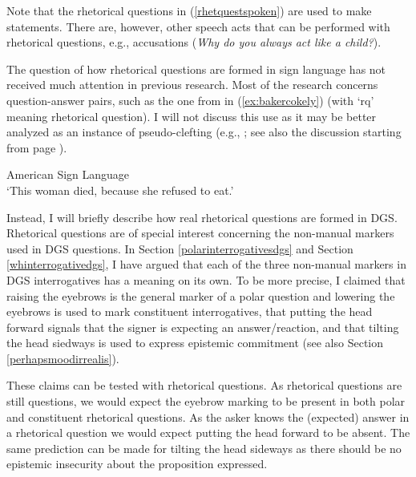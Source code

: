 \noindent Note that the rhetorical questions in (\ref{rhetquestspoken}) are used to make statements. There are, however, other speech acts that can be performed with rhetorical questions, e.g.,  accusations (\textit{Why do you always act like a child?}).

The question of how rhetorical questions are formed in sign language has not received much attention in previous research. Most of the research concerns question-answer pairs, such as the one from \citet[138]{baker1980american} in (\ref{ex:bakercokely}) (with `rq' meaning rhetorical question). I will not discuss this use as it may be better analyzed as an instance of pseudo-clefting (e.g., \citealt{wilbur1996evidence}; see also the discussion starting from page \pageref{pseudocleeeeefts}).%

\begin{exe}
\ex American Sign Language\\   
\glt `This woman died, because she refused to eat.' \label{ex:bakercokely}
\end{exe}

\noindent Instead, I will briefly describe how real rhetorical questions are formed in DGS. Rhetorical questions are of special interest concerning the non-manual markers used in DGS questions. In Section \ref{polarinterrogativesdgs} and Section \ref{whinterrogativedgs}, I have argued that each of the three non-manual markers in DGS interrogatives has a meaning on its own. To be more precise, I claimed that raising the eyebrows is the general marker of a polar question and lowering the eyebrows is used to mark constituent interrogatives, that putting the head forward signals that the signer is expecting an answer/reaction, and that tilting the head siedways is used to express epistemic commitment (see also Section \ref{perhapsmoodirrealis}).

These claims can be tested with rhetorical questions. As rhetorical questions are still questions, we would expect the eyebrow marking to be present in both polar and constituent rhetorical questions. As the asker knows the (expected) answer in a rhetorical question we would expect putting the head forward to be absent. The same prediction can be made for tilting the head sideways as there should be no epistemic insecurity about the proposition expressed.

